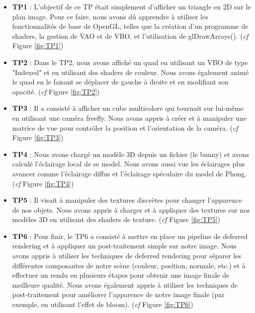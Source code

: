 \documentclass[10pt,a4paper]{article}
\begin{document}
		\begin{itemize}
			\item\textbf{TP1} : L'objectif de ce TP était simplement d'afficher un triangle en 2D sur le plan image. Pour ce faire, nous avons dû apprendre à utiliser les fonctionnalités de base de OpenGL, telles que la création d'un programme de shaders, la gestion de VAO et de VBO, et l'utilisation de glDrawArrays().  (\textit{cf} Figure \ref{fig:TP1})
			\item\textbf{TP2} : Dans le TP2, nous avons affiché un quad en utilisant un VBO de type "Indexed" et en utilisant des shaders de couleur. Nous avons également animé le quad en le faisant se déplacer de gauche à droite et en modifiant son opacité.  (\textit{cf} Figure \ref{fig:TP2})
			\item\textbf{TP3} : Il a consisté à afficher un cube multicolore qui tournait sur lui-même en utilisant une caméra freefly. Nous avons appris à créer et à manipuler une matrice de vue pour contrôler la position et l'orientation de la caméra. (\textit{cf} Figure \ref{fig:TP3})
			\item\textbf{TP4} : Nous avons chargé un modèle 3D depuis un fichier (le bunny) et avons calculé l'éclairage local de se model. Nous avons aussi vue les éclairages plus avancer comme l'éclairage diffus et l'éclairage spéculaire du model de Phong. (\textit{cf} Figure \ref{fig:TP4})
			\item\textbf{TP5} : Il visait à manipuler des textures discrètes pour changer l'apparence de nos objets. Nous avons appris à charger et à appliquer des textures sur nos modèles 3D en utilisant des shaders de texture. (\textit{cf} Figure \ref{fig:TP5})
			\item\textbf{TP6} : Pour finir, le TP6 a consisté à mettre en place un pipeline de deferred rendering et à appliquer un post-traitement simple sur notre image. Nous avons appris à utiliser les techniques de deferred rendering pour séparer les différentes composantes de notre scène (couleur, position, normale, etc.) et à effectuer un rendu en plusieurs étapes pour obtenir une image finale de meilleure qualité. Nous avons également appris à utiliser les techniques de post-traitement pour améliorer l'apparence de notre image finale (par exemple, en utilisant l'effet de bloom). (\textit{cf} Figure \ref{fig:TP6})
		\end{itemize}

	
\end{document}
